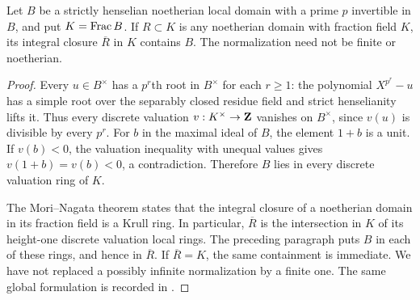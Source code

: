 \begin{lemma}
\label{A:strict-normalization-rigidity}
Let $B$ be a strictly henselian noetherian local domain with a prime
$p$ invertible in $B$, and put $K=\operatorname{Frac} B$. If $R\subset K$ is any
noetherian domain with fraction field $K$, its integral closure
$\overline R$ in $K$ contains $B$. The normalization need not be
finite or noetherian.
\end{lemma}
\begin{proof}
Every $u\in B^\times$ has a $p^r$th root in $B^\times$ for each
$r\geq1$: the polynomial $X^{p^r}-u$ has a simple root over the
separably closed residue field and strict henselianity lifts it.
Thus every discrete valuation $v:K^\times\to\mathbf Z$ vanishes on
$B^\times$, since $v(u)$ is divisible by every $p^r$.
For $b$ in the maximal ideal of $B$, the element $1+b$ is a unit.
If $v(b)<0$, the valuation inequality with unequal values gives
$v(1+b)=v(b)<0$, a contradiction. Therefore $B$ lies in every
discrete valuation ring of $K$.

The Mori--Nagata theorem
\citep[Theorem 4.10.5, pp.~90--92]{A_SwansonHuneke2006}
states that the integral closure of a noetherian domain in its fraction field is a Krull ring. In particular,
$\overline R$ is the intersection in $K$ of its height-one
discrete valuation local rings. The preceding paragraph puts $B$
in each of these rings, and hence in $\overline R$. If
$\overline R=K$, the same containment is immediate. We have not
replaced a possibly infinite normalization by a finite one. The same global formulation is recorded in 
\citet[Chapitre 0, Remarque 23.2.8(iii), p.~220]{A_EGAIV1}.
\end{proof}

